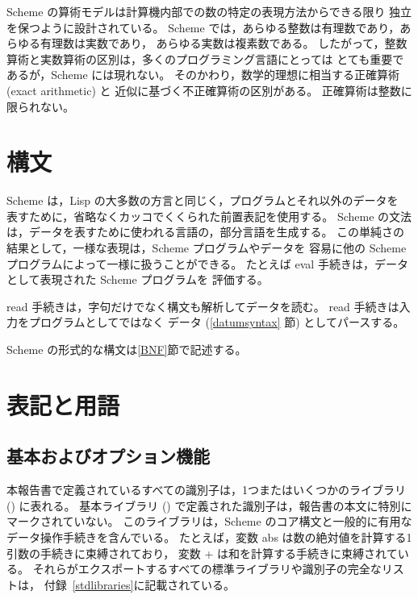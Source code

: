 \vest Scheme の算術モデルは計算機内部での数の特定の表現方法からできる限り
独立を保つように設計されている。
Scheme では，あらゆる整数は有理数であり，あらゆる有理数は実数であり，
あらゆる実数は複素数である。
したがって，整数算術と実数算術の区別は，多くのプログラミング言語にとっては
とても重要であるが，Scheme には現れない。
そのかわり，数学的理想に相当する正確算術 (exact arithmetic) と
近似に基づく不正確算術の区別がある。
正確算術は整数に限られない。

\section{構文}

Scheme は，Lisp の大多数の方言と同じく，プログラムとそれ以外のデータを
表すために，省略なくカッコでくくられた前置表記を使用する。
Scheme の文法は，データを表すために使われる言語の，部分言語を生成する。
この単純さの結果として，一様な表現は，Scheme プログラムやデータを
容易に他の Scheme プログラムによって一様に扱うことができる。
たとえば {\cf eval} 手続きは，データとして表現された Scheme プログラムを
評価する。

{\cf read} 手続きは，字句だけでなく構文も解析してデータを読む。
{\cf read} 手続きは入力をプログラムとしてではなく
データ (\ref{datumsyntax} 節) としてパースする。

Scheme の形式的な構文は\ref{BNF}節で記述する。


\section{表記と用語}


\subsection{基本およびオプション機能}
\label{qualifiers}

本報告書で定義されているすべての識別子は，1つまたはいくつかのライブラリ () に表れる。
基本ライブラリ () で定義された識別子は，報告書の本文に特別にマークされていない。
このライブラリは，Scheme のコア構文と一般的に有用なデータ操作手続きを含んでいる。
たとえば，変数 {\cf abs} は数の絶対値を計算する1引数の手続きに束縛されており，
変数 {\cf +} は和を計算する手続きに束縛されている。
それらがエクスポートするすべての標準ライブラリや識別子の完全なリストは，
付録~\ref{stdlibraries}に記載されている。

